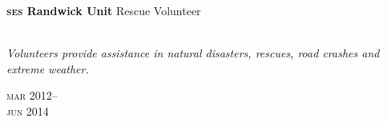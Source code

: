 \begin{minipage}[t]{0.75\textwidth}
\textbf{\textsc{ses} Randwick Unit}\phantom{..} Rescue Volunteer\\
\\
{\small
\textit{Volunteers provide assistance in natural disasters, rescues, road crashes and extreme weather.}
\par}
\end{minipage}
\begin{minipage}[t]{0.25\textwidth}
{
\hfill \textsc{mar} 2012--\\ 
\hspace*{0pt} \hfill \textsc{jun} 2014
\par
}
\end{minipage}



